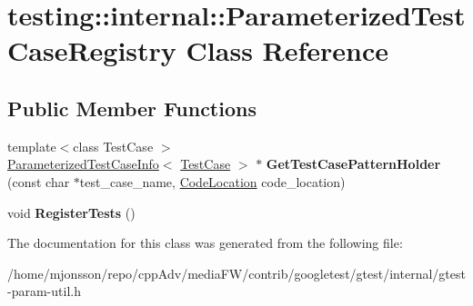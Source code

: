 \hypertarget{classtesting_1_1internal_1_1ParameterizedTestCaseRegistry}{}\section{testing\+:\+:internal\+:\+:Parameterized\+Test\+Case\+Registry Class Reference}
\label{classtesting_1_1internal_1_1ParameterizedTestCaseRegistry}
\subsection*{Public Member Functions}
\begin{DoxyCompactItemize}
\item 
\mbox{\label{classtesting_1_1internal_1_1ParameterizedTestCaseRegistry_af525816aa348f9e33f5d900965991388}} 
{\footnotesize template$<$class Test\+Case $>$ }\\\hyperlink{classtesting_1_1internal_1_1ParameterizedTestCaseInfo}{Parameterized\+Test\+Case\+Info}$<$ \hyperlink{classtesting_1_1TestCase}{Test\+Case} $>$ $\ast$ {\bfseries Get\+Test\+Case\+Pattern\+Holder} (const char $\ast$test\+\_\+case\+\_\+name, \hyperlink{structtesting_1_1internal_1_1CodeLocation}{Code\+Location} code\+\_\+location)
\item 
\mbox{\label{classtesting_1_1internal_1_1ParameterizedTestCaseRegistry_ad5b63c8fe94f3d51d039a76c001c9223}} 
void {\bfseries Register\+Tests} ()
\end{DoxyCompactItemize}


The documentation for this class was generated from the following file\+:\begin{DoxyCompactItemize}
\item 
/home/mjonsson/repo/cpp\+Adv/media\+F\+W/contrib/googletest/gtest/internal/gtest-\/param-\/util.\+h\end{DoxyCompactItemize}
